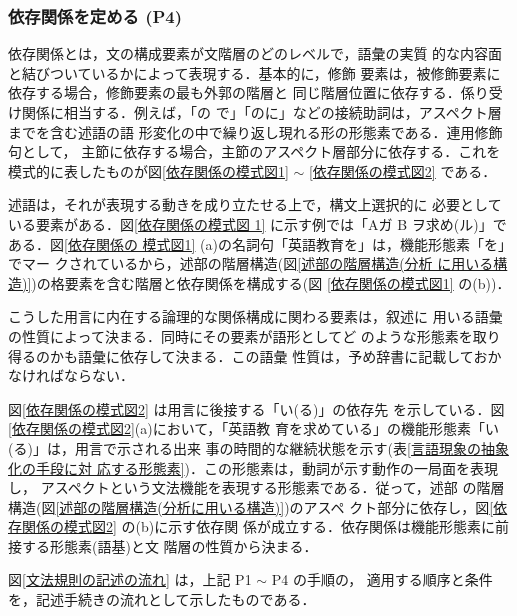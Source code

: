 \subsubsection*{依存関係を定める (P4)}

依存関係とは，文の構成要素が文階層のどのレベルで，語彙の実質
的な内容面と結びついているかによって表現する．基本的に，修飾
要素は，被修飾要素に依存する場合，修飾要素の最も外郭の階層と
同じ階層位置に依存する．係り受け関係に相当する．例えば，「の
で」「のに」などの接続助詞は，アスペクト層までを含む述語の語
形変化の中で繰り返し現れる形の形態素である．連用修飾句として，
主節に依存する場合，主節のアスペクト層部分に依存する．これを
模式的に表したものが図\ref{依存関係の模式図1} $\sim$
\ref{依存関係の模式図2} である．

\bfg
{}
\vspace{0.5mm}

述語は，それが表現する動きを成り立たせる上で，構文上選択的に
必要としている要素がある\cite{仁田}．図\ref{依存関係の模式図
1} に示す例では「Aガ B ヲ求め(ル)」である．図\ref{依存関係の
模式図1} (a)の名詞句「英語教育を」は，機能形態素「を」でマー
クされているから，述部の階層構造(図\ref{述部の階層構造(分析
に用いる構造)})の格要素を含む階層と依存関係を構成する(図
\ref{依存関係の模式図1} の(b))．

こうした用言に内在する論理的な関係構成に関わる要素は，叙述に
用いる語彙の性質によって決まる．同時にその要素が語形としてど
のような形態素を取り得るのかも語彙に依存して決まる．この語彙
性質は，予め辞書に記載しておかなければならない．

\bfg
{}
\vspace{0.3mm}
\vspace*{-0.5mm}


図\ref{依存関係の模式図2} は用言に後接する「い(る)」の依存先
を示している．図\ref{依存関係の模式図2}(a)において，「英語教
育を求めている」の機能形態素「い(る)」は，用言で示される出来
事の時間的な継続状態を示す(表\ref{言語現象の抽象化の手段に対
応する形態素})．この形態素は，動詞が示す動作の一局面を表現し，
アスペクトという文法機能を表現する形態素である．従って，述部
の階層構造(図\ref{述部の階層構造(分析に用いる構造)})のアスペ
クト部分に依存し，図\ref{依存関係の模式図2} の(b)に示す依存関
係が成立する．依存関係は機能形態素に前接する形態素(語基)と文
階層の性質から決まる．

図\ref{文法規則の記述の流れ} は，上記 P1 $\sim$ P4 の手順の，
適用する順序と条件を，記述手続きの流れとして示したものである．

